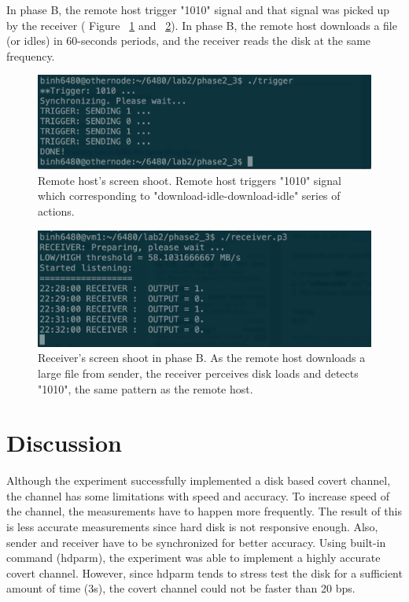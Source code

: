 In phase B, the remote host trigger "1010" signal and that signal was picked up by 
the receiver ( Figure ~\ref{fig:remotehost} and ~\ref{fig:receiver-b}). In phase B, 
the remote host downloads a file (or idles) in 60-seconds periods, and the receiver 
reads the disk at the same frequency.\\
\begin{figure}[hbtp]
\centering
\includegraphics[scale=0.3]{remotehost.png}
\caption{Remote host's screen shoot. Remote host triggers "1010" signal which 
corresponding to "download-idle-download-idle" series of actions.}
\label{fig:remotehost}
\end{figure}

\begin{figure}[hbtp]
\centering
\includegraphics[scale=0.3]{receiver-b.png}
\caption{Receiver's screen shoot in phase B. As the remote host downloads a 
large file from sender, the receiver perceives disk loads and detects 
"1010", the same pattern as the remote host.}
\label{fig:receiver-b}
\end{figure}

\section{Discussion}
Although the experiment successfully implemented a disk based covert channel, 
the channel has some limitations with speed and accuracy. To increase speed 
of the channel, the measurements have to happen more frequently. The result of 
this is less accurate measurements since hard disk is not responsive enough. 
Also, sender and receiver have to be synchronized for better accuracy. Using 
built-in command (hdparm), the experiment was able to implement a highly accurate 
covert channel. However, since hdparm tends to stress test the disk for a 
sufficient amount of time (3s), the covert channel could not be faster than 20 bps.\\

